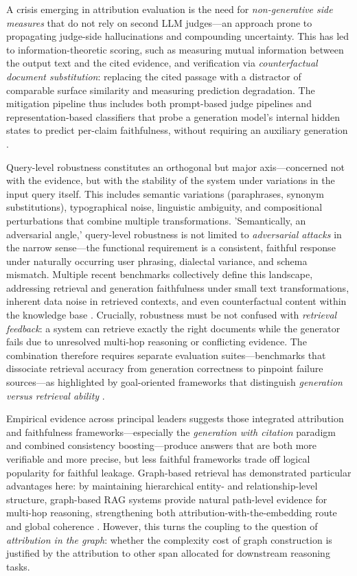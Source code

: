 \documentclass[11pt,a4paper]{article}
\begin{document}
A crisis emerging in attribution evaluation is the need for \emph{non-generative side measures} that do not rely on second LLM judges---an approach prone to propagating judge-side hallucinations and compounding uncertainty. This has led to information-theoretic scoring, such as measuring mutual information between the output text and the cited evidence, and verification via \emph{counterfactual document substitution}: replacing the cited passage with a distractor of comparable surface similarity and measuring prediction degradation. The mitigation pipeline thus includes both prompt-based judge pipelines and representation-based classifiers that probe a generation model's internal hidden states to predict per-claim faithfulness, without requiring an auxiliary generation \cite{arxiv:2411.14572v1}.

Query-level robustness constitutes an orthogonal but major axis---concerned not with the evidence, but with the stability of the system under variations in the input query itself. This includes semantic variations (paraphrases, synonym substitutions), typographical noise, linguistic ambiguity, and compositional perturbations that combine multiple transformations. 'Semantically, an adversarial angle,' query-level robustness is not limited to \emph{adversarial attacks} in the narrow sense---the functional requirement is a consistent, faithful response under naturally occurring user phrasing, dialectal variance, and schema mismatch. Multiple recent benchmarks collectively define this landscape, addressing retrieval and generation faithfulness under small text transformations, inherent data noise in retrieved contexts, and even counterfactual content within the knowledge base \cite{arxiv:2504.19754v1,arxiv:2503.10150v3}. Crucially, robustness must be not confused with \emph{retrieval feedback}: a system can retrieve exactly the right documents while the generator fails due to unresolved multi-hop reasoning or conflicting evidence. The combination therefore requires separate evaluation suites---benchmarks that dissociate retrieval accuracy from generation correctness to pinpoint failure sources---as highlighted by goal-oriented frameworks that distinguish \emph{generation versus retrieval ability} \cite{arxiv:2502.11371v3}.

Empirical evidence across principal leaders \cite{arxiv:2502.11371v3} suggests those integrated attribution and faithfulness frameworks---especially the \emph{generation with citation} paradigm and combined consistency boosting---produce answers that are both more verifiable and more precise, but less faithful frameworks trade off logical popularity for faithful leakage. Graph-based retrieval has demonstrated particular advantages here: by maintaining hierarchical entity- and relationship-level structure, graph-based RAG systems provide natural path-level evidence for multi-hop reasoning, strengthening both attribution-with-the-embedding route and global coherence \cite{arxiv:2502.06864v1}. However, this turns the coupling to the question of \emph{attribution in the graph}: whether the complexity cost of graph construction is justified by the attribution to other span allocated for downstream reasoning tasks.
\end{document}
